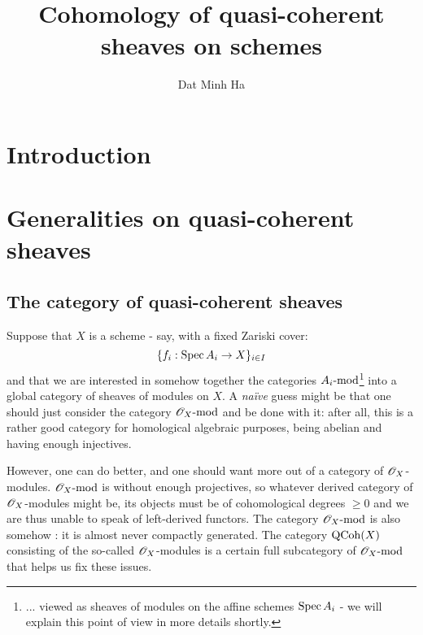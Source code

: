 

\setcounter{section}{-1}





    \title{Cohomology of quasi-coherent sheaves on schemes}
    
    \author{Dat Minh Ha}
    \maketitle
    
    \begin{abstract}
        
    \end{abstract}
    
    {
      \hypersetup{} 
      \tableofcontents %
    }

    \section{Introduction}

    \section{Generalities on quasi-coherent sheaves}
        \subsection{The category of quasi-coherent sheaves}
            Suppose that $X$ is a scheme - say, with a fixed Zariski cover:
                $$\{ f_i: \Spec A_i \to X \}_{i \in I}$$
            and that we are interested in somehow  together the categories $A_i\mod$\footnote{... viewed as sheaves of modules on the affine schemes $\Spec A_i$ - we will explain this point of view in more details shortly.} into a global category of sheaves of modules on $X$. A \textit{na\"ive} guess might be that one should just consider the category $\scrO_X\mod$ and be done with it: after all, this is a rather good category for homological algebraic purposes, being abelian and having enough injectives.
            
            However, one can do better, and one should want more out of a category of $\scrO_X$-modules. $\scrO_X\mod$ is without enough projectives, so whatever  derived category of $\scrO_X$-modules might be, its objects must be of cohomological degrees $\geq 0$ and we are thus unable to speak of left-derived functors. The category $\scrO_X\mod$ is also somehow : it is almost never compactly generated. The category $\QCoh(X)$ consisting of the so-called  $\scrO_X$-modules is a certain full subcategory of $\scrO_X\mod$ that helps us fix these issues.

